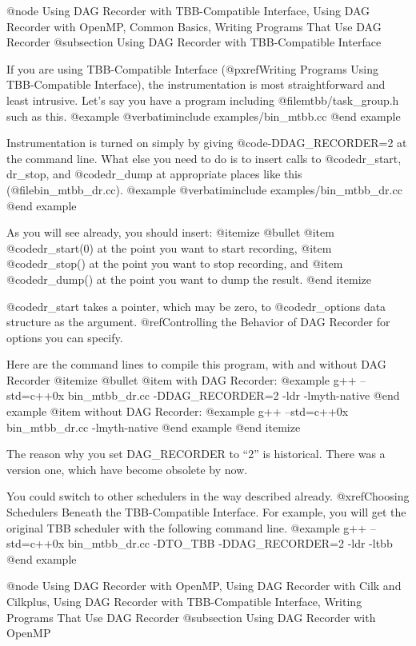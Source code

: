 @node Using DAG Recorder with TBB-Compatible Interface, Using DAG Recorder with OpenMP, Common Basics, Writing Programs That Use DAG Recorder
@subsection Using DAG Recorder with TBB-Compatible Interface

If you are using TBB-Compatible Interface (@pxref{Writing Programs Using TBB-Compatible Interface}), the instrumentation is most straightforward and least intrusive.  Let's say you have a program including @file{mtbb/task_group.h} such as this.
@example
@verbatiminclude examples/bin_mtbb.cc
@end example

Instrumentation is turned on simply by giving @code{-DDAG_RECORDER=2} at the command line.  What else you need to do is to insert calls to @code{dr_start, dr_stop,} and @code{dr_dump} at appropriate places like this  (@file{bin_mtbb_dr.cc}).
@example
@verbatiminclude examples/bin_mtbb_dr.cc
@end example

As you will see already, you should insert:
@itemize @bullet
@item @code{dr_start(0)} at the point you want to start recording,
@item @code{dr_stop()} at the point you want to stop recording, and
@item @code{dr_dump()} at the point you want to dump the result.
@end itemize

@code{dr_start} takes a pointer, which may be zero, to @code{dr_options} data structure as the argument.  
@ref{Controlling the Behavior of DAG Recorder} for options you can specify.

Here are the command lines to compile this program, with and without DAG Recorder
@itemize @bullet
@item with DAG Recorder:
@example
g++ --std=c++0x bin_mtbb_dr.cc -DDAG_RECORDER=2 -ldr -lmyth-native 
@end example
@item without DAG Recorder:
@example
g++ --std=c++0x bin_mtbb_dr.cc -lmyth-native
@end example
@end itemize

The reason why you set DAG_RECORDER to ``2'' is historical.  There was a version one, which have become obsolete by now.

You could switch to other schedulers in the way described already. @xref{Choosing Schedulers Beneath the TBB-Compatible Interface}.  For example, you will get the original TBB scheduler with the following command line.
@example
g++ --std=c++0x bin_mtbb_dr.cc -DTO_TBB -DDAG_RECORDER=2 -ldr -ltbb 
@end example

@node Using DAG Recorder with OpenMP, Using DAG Recorder with Cilk and Cilkplus, Using DAG Recorder with TBB-Compatible Interface, Writing Programs That Use DAG Recorder
@subsection Using DAG Recorder with OpenMP

